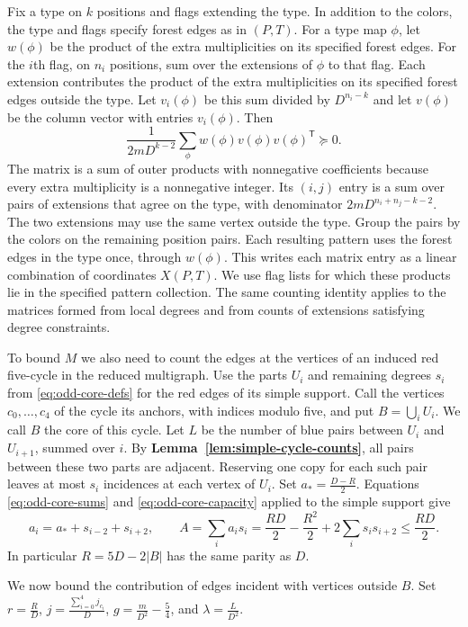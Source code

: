 \documentclass[preprint,11pt,numbers]{elsarticle-arxiv}
\numberwithin{equation}{section}
\theoremstyle{definition}
\begin{document}
Fix a type on $k$ positions and flags extending the type. In addition
to the colors, the type and flags specify forest edges as in $(P,T)$.
For a type map $\phi$, let $w(\phi)$ be the product of the extra
multiplicities on its specified forest edges. For the $i$th flag, on
$n_i$ positions, sum over the extensions of $\phi$ to that flag. Each
extension contributes the product of the extra multiplicities on its
specified forest edges outside the type. Let $v_i(\phi)$ be this sum
divided by $D^{n_i-k}$ and let $v(\phi)$ be the column vector with
entries $v_i(\phi)$. Then
\[
 \frac{1}{2mD^{k-2}}\sum_\phi w(\phi)v(\phi)v(\phi)^{\mathsf T}\succeq0.
\]
The matrix is a sum of outer products with nonnegative coefficients
because every extra multiplicity is a nonnegative integer. Its $(i,j)$ entry is a sum over pairs of extensions that agree on the type,
with denominator $2mD^{n_i+n_j-k-2}$. The two extensions may use the
same vertex outside the type. Group the pairs by the colors on the
remaining position pairs. Each resulting pattern uses the forest
edges in the type once, through $w(\phi)$. This writes each matrix
entry as a linear combination of coordinates $X(P,T)$. We use flag
lists for which these products lie in the specified pattern collection.
The same counting identity applies to the matrices formed from local
degrees and from counts of extensions satisfying degree constraints.

To bound $M$ we also need to count the edges at the vertices of an
induced red five-cycle in the reduced multigraph. Use the parts $U_i$
and remaining degrees $s_i$ from \eqref{eq:odd-core-defs} for the red
edges of its simple support. Call the vertices $c_0,\ldots,c_4$ of
the cycle its anchors, with indices modulo five, and put
$B=\bigcup_i U_i$. We call $B$ the core of this cycle.
Let $L$ be the number of blue pairs between $U_i$ and $U_{i+1}$,
summed over $i$. By \textbf{Lemma~\ref{lem:simple-cycle-counts}},
all pairs between these two parts are adjacent. Reserving one copy
for each such pair leaves at most $s_i$ incidences at each vertex of
$U_i$. Set $a_*=\frac{D-R}{2}$. Equations \eqref{eq:odd-core-sums}
and \eqref{eq:odd-core-capacity} applied to the simple support give
\begin{equation}\label{eq:multi-core-identities}
 a_i=a_*+s_{i-2}+s_{i+2},\qquad
 A=\sum_i a_is_i=\frac{RD}{2}-\frac{R^2}{2}
             +2\sum_i s_i s_{i+2}\le\frac{RD}{2}.
\end{equation}
In particular $R=5D-2|B|$ has the same parity as $D$.

We now bound the contribution of edges incident with vertices outside $B$.
Set $r=\frac{R}{D}$, $j=\frac{\sum_{i=0}^4j_{c_i}}{D}$,
$g=\frac{m}{D^2}-\frac{5}{4}$, and $\lambda=\frac{L}{D^2}$.
\end{document}

